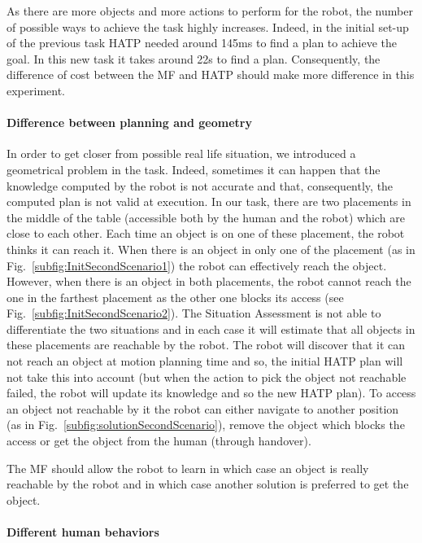 \documentclass[english,a4paper,11pt,twoside]{StyleThese}
\begin{document}
As there are more objects and more actions to perform for the robot, the number of possible ways to achieve the task highly increases. Indeed, in the initial set-up of the previous task HATP needed around 145ms to find a plan to achieve the goal. In this new task it takes around 22s to find a plan. Consequently, the difference of cost between the MF and HATP should make more difference in this experiment.

\paragraph{Difference between planning and geometry}

In order to get closer from possible real life situation, we introduced a geometrical problem in the task. Indeed, sometimes it can happen that the knowledge computed by the robot is not accurate and that, consequently, the computed plan is not valid at execution. In our task, there are two placements in the middle of the table (accessible both by the human and the robot) which are close to each other. Each time an object is on one of these placement, the robot thinks it can reach it. When there is an object in only one of the placement (as in Fig.~\ref{subfig:InitSecondScenario1}) the robot can effectively reach the object. However, when there is an object in both placements, the robot cannot reach the one in the farthest placement as the other one blocks its access (see Fig.~\ref{subfig:InitSecondScenario2}). The Situation Assessment is not able to differentiate the two situations and in each case it will estimate that all objects in these placements are reachable by the robot. The robot will discover that it can not reach an object at motion planning time and so, the initial HATP plan will not take this into account (but when the action to pick the object not reachable failed, the robot will update its knowledge and so the new HATP plan). To access an object not reachable by it the robot can either navigate to another position (as in Fig.~\ref{subfig:solutionSecondScenario}), remove the object which blocks the access or get the object from the human (through handover).

The MF should allow the robot to learn in which case an object is really reachable by the robot and in which case another solution is preferred to get the object.

\paragraph{Different human behaviors}
\end{document}
